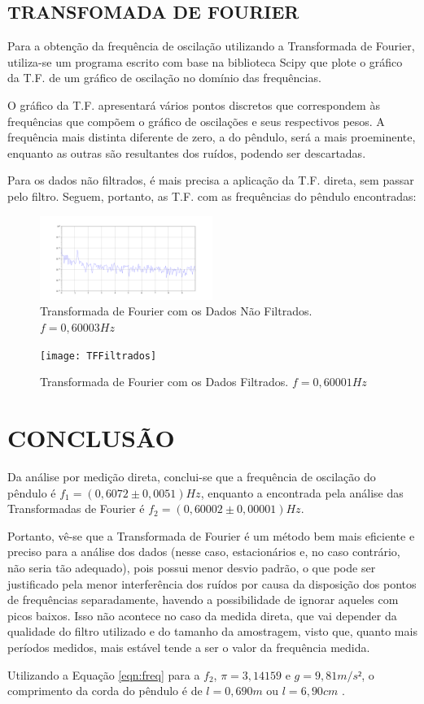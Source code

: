 \documentclass[10pt,a4paper,twocolumn]{article}
\begin{document}
\subsection{TRANSFOMADA DE FOURIER}
\par Para a obtenção da frequência de oscilação utilizando a Transformada de Fourier, utiliza-se um programa escrito com base na biblioteca Scipy que plote o gráfico da T.F. de um gráfico de oscilação no domínio das frequências.
\par O gráfico da T.F. apresentará vários pontos discretos que correspondem às frequências que compõem o gráfico de oscilações e seus respectivos pesos. A frequência mais distinta diferente de zero, a do pêndulo, será a mais proeminente, enquanto as outras são resultantes dos ruídos, podendo ser descartadas.  
\par Para os dados não filtrados, é mais precisa a aplicação da T.F. direta, sem passar pelo filtro. Seguem, portanto, as T.F. com as frequências do pêndulo encontradas:
\begin{figure}[H]
\includegraphics[width=0.5\textwidth, left]{TFNãoFiltrados}
\caption{Transformada de Fourier com os Dados Não Filtrados.
 $f=0,60003 Hz$ \centering}
\label{fig:tfnaofiltrados}
\end{figure}
\begin{figure}[H]
\texttt{[image: TFFiltrados]}
\caption{Transformada de Fourier com os Dados Filtrados.
 $f=0,60001 Hz$ \centering}
\label{fig:tffiltrados}
\end{figure}
\section{CONCLUSÃO}
\par Da análise por medição direta, conclui-se que a frequência de oscilação do pêndulo é $f_1=(0,6072\pm0,0051) Hz$, enquanto a encontrada pela análise das Transformadas de Fourier é $f_2=(0,60002\pm0,00001) Hz$.
\par Portanto, vê-se que a Transformada de Fourier é um método bem mais eficiente e preciso para a análise dos dados (nesse caso, estacionários e, no caso contrário, não seria tão adequado), pois possui menor desvio padrão, o que pode ser justificado pela menor interferência dos ruídos por causa da disposição dos pontos de frequências separadamente, havendo a possibilidade de ignorar aqueles com picos baixos. Isso não acontece no caso da medida direta, que vai depender da qualidade do filtro utilizado e do tamanho da amostragem, visto que, quanto mais períodos medidos, mais estável tende a ser o valor da frequência medida.  
\par Utilizando a Equação \ref{eqn:freq} para a $f_2$, $\pi=3,14159$ e $g=9,81m/s²$, o comprimento da corda do pêndulo é de $l=0,690 m$ ou $l=6,90 cm$ .
\pagebreak
\nocite{cerqueira2000utilizaccao, mathuranathan2010, carlos2018, numpydoc, matplotdoc, pandasdoc, scipydoc}


\end{document}
